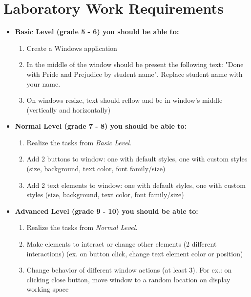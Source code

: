 \documentclass[12pt,a4paper,titlepage]{article}
\begin{document}
		\section{Laboratory Work Requirements}
		\begin{itemize}
			\item \textbf{Basic Level (grade 5 - 6) you should be able to:}
		\begin{enumerate}
			\item Create a Windows application
      		\item In the middle of the window should be present the following text: "Done with Pride and Prejudice by student name". Replace student name with your name.
      		\item On windows resize, text should reflow and be in window's middle (vertically and horizontally)
      	\end{enumerate}
			\item \textbf{Normal Level (grade 7 - 8) you should be able to:}
      	\begin{enumerate}
    			\item Realize the tasks from \textit{Basic Level}.
    			\item Add 2 buttons to window: one with default styles, one with custom styles (size, background, text color, font family/size)
    			\item Add 2 text elements to window: one with default styles, one with custom styles (size, background, text color, font family/size)
          \end{enumerate}
			\item \textbf{Advanced Level (grade 9 - 10) you should be able to:}
		  \begin{enumerate}
    			\item Realize the tasks from \textit{Normal Level}.
    			\item Make elements to interact or change other elements (2 different interactions)  (ex. on button click, change text element color or position)
    			\item Change behavior of different window actions (at least 3). For ex.: on clicking close button, move window to a random location on display working space 
          \end{enumerate}
		\end{itemize}
		\clearpage
	\pagebreak
	\newpage
	\renewcommand*{\theenumi}{\thesection.\arabic{enumi}}
\end{document}
